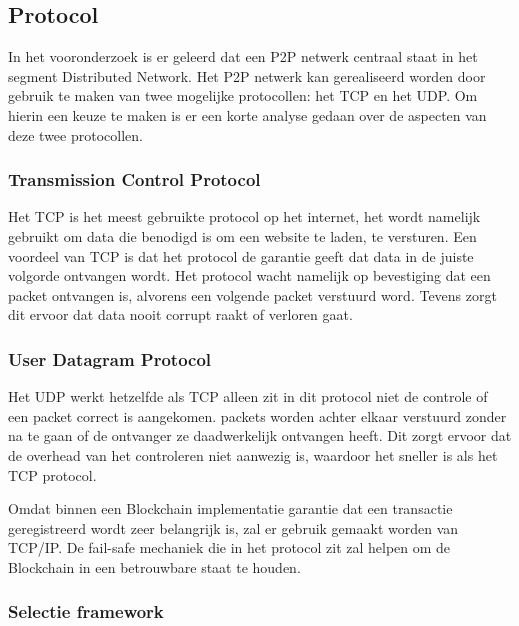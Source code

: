 \subsection{Protocol}

In het vooronderzoek is er geleerd dat een \acrfull{P2P} netwerk centraal staat in het segment Distributed Network. Het \acrshort{P2P} netwerk kan gerealiseerd worden door gebruik te maken van twee mogelijke protocollen: het \acrfull{TCP} en het \acrfull{UDP}. Om hierin een keuze te maken is er een korte analyse gedaan over de aspecten van deze twee protocollen.

\subsubsection{Transmission Control Protocol} 

Het \acrfull{TCP} is het meest gebruikte protocol op het internet, het wordt namelijk gebruikt om data die benodigd is om een website te laden, te versturen. Een voordeel van \acrshort{TCP} is dat het protocol de garantie geeft dat data in de juiste volgorde ontvangen wordt. Het protocol wacht namelijk op bevestiging dat een \gls{packet} ontvangen is, alvorens een volgende \gls{packet} verstuurd word. Tevens zorgt dit ervoor dat data nooit corrupt raakt of verloren gaat.

\clearpage
\subsubsection{User Datagram Protocol}

Het \acrfull{UDP} werkt hetzelfde als \acrshort{TCP} alleen zit in dit protocol niet de controle of een \gls{packet} correct is aangekomen. \Glspl{packet} worden achter elkaar verstuurd zonder na te gaan of de ontvanger ze daadwerkelijk ontvangen heeft. Dit zorgt ervoor dat de overhead van het controleren niet aanwezig is, waardoor het sneller is als het \acrshort{TCP} protocol.

Omdat binnen een Blockchain implementatie garantie dat een transactie geregistreerd wordt zeer belangrijk is, zal er gebruik gemaakt worden van TCP/IP. De fail-safe mechaniek die in het protocol zit zal helpen om de Blockchain in een betrouwbare staat te houden.

\subsubsection{Selectie framework}

